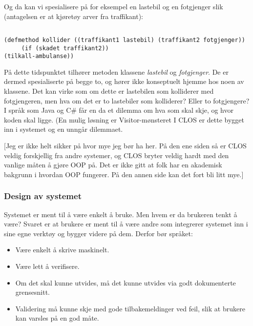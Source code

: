 \documentclass[11pt]{article}
\begin{document}
Og da kan vi spesialisere på for eksempel en lastebil og en fotgjenger slik (antagelsen er at kjøretøy arver fra traffikant):




\begin{lstlisting}

(defmethod kollider ((traffikant1 lastebil) (traffikant2 fotgjenger))
     (if (skadet traffikant2))
(tilkall-ambulanse))
\end{lstlisting}




På dette tidspunktet tilhører metoden klassene \emph{lastebil} og \emph{fotgjenger}. De er dermed spesialiserte på begge to, og hører ikke konseptuelt hjemme hos noen av klassene. Det kan virke som om dette er lastebilen som kolliderer med fotgjengeren, men hva om det er to lastebiler som kolliderer? Eller to fotgjengere? I språk som Java og C\# får en da et dilemma om hva som skal skje, og hvor koden skal ligge. (En mulig løsning er Visitor-mønsteret  I CLOS er dette bygget inn i systemet og en unngår dilemmaet.



[Jeg er ikke helt sikker på hvor mye jeg bør ha her. På den ene siden så er CLOS veldig forskjellig fra andre systemer, og CLOS bryter veldig hardt med den vanlige måten å gjøre OOP på. Det er ikke gitt at folk har en akademisk bakgrunn i hvordan OOP fungerer. På den annen side kan det fort bli litt mye.]



\subsubsection{Design av systemet}



Systemet er ment til å være enkelt å bruke. Men hvem er da brukeren tenkt å være?
Svaret er at brukere er ment til å være andre som integrerer systemet inn i sine egne verktøy og bygger videre på dem.
Derfor bør språket:




\begin{itemize}
\item Være enkelt å skrive maskinelt.
\item Være lett å verifisere.
\item Om det skal kunne utvides, må det kunne utvides via godt dokumenterte grensesnitt.
\item Validering må kunne skje med gode tilbakemeldinger ved feil, slik at brukere kan varsles på en god måte.
\end{itemize}
\end{document}
